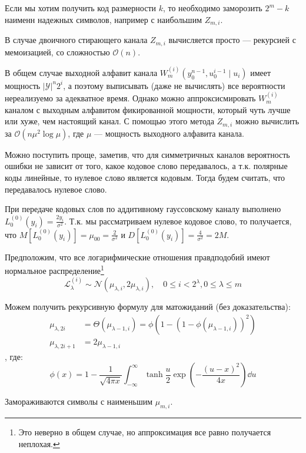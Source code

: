 Если мы хотим получить код размерности \(k\),
то необходимо заморозить \(2^m - k\) наименн надежных символов,
например с наибольшим \(Z_{m,i}\).

В случае двоичного стирающего канала \(Z_{m,i}\) вычисляется просто --- рекурсией с мемоизацией,
со сложностью \(\mathcal{O}(n)\).

В общем случае выходной алфавит канала \(W_m^{(i)}(y^{n-1}_0, u^{i-1}_0 \mid u_i)\)
имеет мощность \(|\mathcal{Y} |^n 2^i\), а поэтому выписывать (даже не вычислять)
все вероятности нереализуемо за адекватное время.
Однако можно аппроксисмировать \(W_m^{(i)}\) каналом с выходным алфавитом фикированной мощности,
который чуть лучше или хуже, чем настоящий канал.
С помощью этого метода \(Z_{m,i}\) можно вычислить за \(\mathcal{O}(n \mu^2 \log\mu)\),
где \(\mu\) --- мощность выходного алфавита канала.

Можно поступить проще, заметив, что для симметричных каналов
вероятность ошибки не зависит от того, какое кодовое слово передавалось,
а т.к. полярные коды линейные, то нулевое слово является кодовым.
Тогда будем считать, что передавалось нулевое слово.

\begin{example}
    При передаче кодовых слов по аддитивному гауссовскому каналу выполнено
    \(L_0^{(0)}(y_i) = \frac{2y_i}{\sigma^2}\).
    Т.к. мы рассматриваем нулевое кодовое слово, то получается, что
    \(M[L_0^{(0)}(y_i)] = \mu_{00} = \frac{2}{\sigma^2}\) и \(D[L_0^{(0)}(y_i)] = \frac{4}{\sigma^2} = 2M\).
\end{example}

Предположим, что все логарифмические отношения правдподобий имеют нормальное распределение\footnote{Это неверно в общем случае, но аппроксимация все равно получается неплохая.}
\[\mathcal{L}_\lambda^{(i)} \sim \mathcal{N}(\mu_{\lambda,i}, 2\mu_{\lambda,i}), \quad 0 \leq i < 2^\lambda, 0 \leq \lambda \leq m\]

Можем получить рекурсивную формулу для матожиданий (без доказательства):
\begin{align*}
    \mu_{\lambda, 2i} & = \Theta(\mu_{\lambda - 1,i}) = \phi(1 - (1 - \phi(\mu_{\lambda - 1,i}))^2) \\
    \mu_{\lambda,2i + 1} & = 2 \mu_{\lambda - 1, i}
\end{align*}
, где:
\[\phi(x) = 1 - \frac{1}{\sqrt{4\pi x}} \int_{ - \infty}^{\infty} \tanh \frac{u}{2} \exp( - \frac{(u - x)^2}{4x}) \dd{u}\]

Замораживаются символы с наименьшим \(\mu_{m,i}\).

